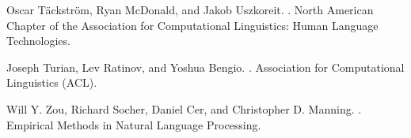 \documentclass[11pt,a4paper]{article}
\begin{document}
\begin{thebibliography}{}
 Oscar T\"{a}ckstr\"{o}m, Ryan McDonald, and Jakob Uszkoreit.
.
\newblock North American Chapter of the Association for Computational Linguistics: Human Language Technologies.

Joseph Turian, Lev Ratinov, and Yoshua Bengio.
.
\newblock Association for Computational Linguistics (ACL).

 Will Y. Zou, Richard Socher, Daniel Cer, and Christopher D. Manning.
.
\newblock Empirical Methods in Natural Language Processing.




\end{thebibliography}
\end{document}
